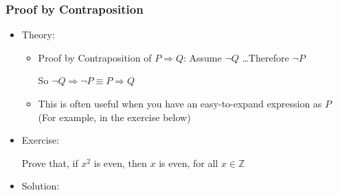\documentclass[9pt]{beamer}
\begin{document}
\begin{frame}[fragile]
  \frametitle{Proof by Contraposition}
     \begin{itemize}
        \item Theory:
        \begin{itemize}
            \item Proof by Contraposition of $P \Rightarrow Q$: Assume $\neg Q$ \dots Therefore $\neg P$
            
            So $\neg Q \Rightarrow \neg P \equiv P \Rightarrow Q$

            \item This is often useful when you have an easy-to-expand expression as $P$ (For example, in the exercise below)
        \end{itemize}
        \item Exercise:

            Prove that, if $x^2$ is even, then $x$ is even, for all $x \in \mathbb{Z}$
            
       \item Solution:

    \end{itemize}   
\end{frame}
\end{document}
